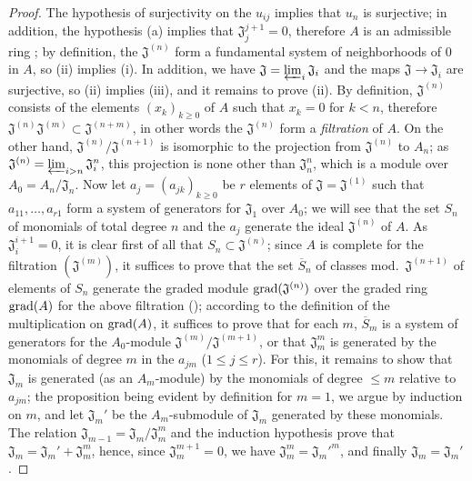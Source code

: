 \begin{proof}
The hypothesis of surjectivity on the $u_{ij}$ implies that $u_n$ is surjective;
in addition, the hypothesis (a) implies that $\mathfrak{J}_j^{j+1}=0$, therefore
$A$ is an admissible ring ; by definition, the
$\mathfrak{J}^{(n)}$ form a fundamental system of neighborhoods of $0$ in $A$,
so (ii) implies (i). In addition, we have
$\mathfrak{J}=\varprojlim_i\mathfrak{J}_i$ and the maps
$\mathfrak{J}\to\mathfrak{J}_i$ are surjective, so (ii) implies (iii), and it
remains to prove (ii). By definition, $\mathfrak{J}^{(n)}$ consists of the
elements $(x_k)_{k\geq 0}$ of $A$ such that $x_k=0$ for $k<n$, therefore
$\mathfrak{J}^{(n)}\mathfrak{J}^{(m)}\subset\mathfrak{J}^{(n+m)}$, in other
words the $\mathfrak{J}^{(n)}$ form a \emph{filtration} of $A$. On the other
hand, $\mathfrak{J}^{(n)}/\mathfrak{J}^{(n+1)}$ is isomorphic to the projection
from $\mathfrak{J}^{(n)}$ to $A_n$; as
$\mathfrak{J}^{(n)}=\varprojlim_{i>n}\mathfrak{J}_i^n$, this projection is none
other than $\mathfrak{J}_n^n$, which is a module over $A_0=A_n/\mathfrak{J}_n$.
Now let $a_j=(a_{jk})_{k\geq 0}$ be $r$ elements of
$\mathfrak{J}=\mathfrak{J}^{(1)}$ such that $a_{11},\dots,a_{r1}$ form a system
of generators for $\mathfrak{J}_1$ over $A_0$; we will see that the set $S_n$ of
monomials of total degree $n$ and the $a_j$ generate the ideal
$\mathfrak{J}^{(n)}$ of $A$. As $\mathfrak{J}_i^{i+1}=0$, it is clear first of
all that $S_n\subset\mathfrak{J}^{(n)}$; since $A$ is complete for the
filtration $(\mathfrak{J}^{(m)})$, it suffices to prove that the set
$\overline{S}_n$ of classes mod.~$\mathfrak{J}^{(n+1)}$ of elements of $S_n$
generate the graded module ${\mathop{\mathrm{grad}}\nolimits}(\mathfrak{J}^{(n)})$ over the graded ring
${\mathop{\mathrm{grad}}\nolimits}(A)$ for the above filtration (\cite[p.~18--06, lemme]{I-1}); according to
the definition of the multiplication on ${\mathop{\mathrm{grad}}\nolimits}(A)$,
it suffices to prove that for each $m$, $\overline{S}_m$ is a system of
generators for the $A_0$-module $\mathfrak{J}^{(m)}/\mathfrak{J}^{(m+1)}$, or
that $\mathfrak{J}_m^m$ is generated by the monomials of degree $m$ in the
$a_{jm}$ ($1\leq j\leq r$). For this, it remains to show that
$\mathfrak{J}_m$ is generated (as an $A_m$-module) by the monomials of degree
$\leq m$ relative to $a_{jm}$; the proposition being evident by definition
for $m=1$, we argue by induction on $m$, and let $\mathfrak{J}_m'$ be the
$A_m$-submodule of $\mathfrak{J}_m$ generated by these monomials. The relation
$\mathfrak{J}_{m-1}=\mathfrak{J}_m/\mathfrak{J}_m^m$ and the induction
hypothesis prove that $\mathfrak{J}_m=\mathfrak{J}_m'+\mathfrak{J}_m^m$, hence,
since $\mathfrak{J}_m^{m+1}=0$, we have $\mathfrak{J}_m^m={\mathfrak{J}_m'}^m$,
and finally $\mathfrak{J}_m=\mathfrak{J}_m'$.
\end{proof}

